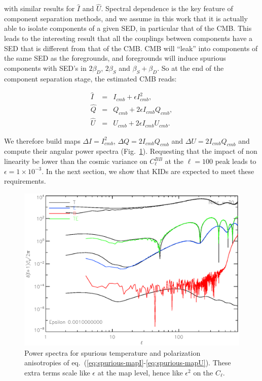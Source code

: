 \noindent with similar results for $\hat{I}$ and $\hat{U}$. Spectral dependence is the key
feature of component separation methods, and we assume in this work that it is
actually able to isolate components of a given SED, in particular that of the
CMB. This leads to the interesting result that all the couplings between
components have a SED that is different from that of the CMB. CMB will ``leak''
into components of the same SED as the foregrounds, and foregrounds will induce
spurious components with SED's in $2\beta_D$, $2\beta_S$ and
$\beta_S+\beta_D$. So at the end of the component separation stage, the
estimated CMB reads:

\begin{eqnarray}
\hat{I} &=& I_{cmb} +  \epsilon I_{cmb}^2, \label{eq:spurious-mapI}\\
\hat{Q} &=& Q_{cmb} + 2\epsilon I_{cmb}Q_{cmb}, \label{eq:spurious-mapQ}\\
\hat{U} &=& U_{cmb} + 2\epsilon I_{cmb}U_{cmb} \label{eq:spurious-mapU}.
\end{eqnarray}

We therefore build maps $\Delta I = I_{cmb}^2$, $\Delta Q = 2I_{cmb}Q_{cmb}$ and
$\Delta U = 2I_{cmb}Q_{cmb}$ and compute their angular power spectra
(Fig.~\ref{fig:fg_nl_residuals}). Requesting that the impact of non linearity be
lower than the cosmic variance on $C^{BB}_\ell$ at the $\ell=100$ peak leads to
$\epsilon = 1\times 10^{-3}$. In the next section, we show that KIDs are expected
to meet these requirements.



\begin{figure}
\center
\includegraphics[clip,angle=0,width=\columnwidth]{Figures/non_linear_fg_residuals_cl_epsilon_1d-3.eps}
\caption{Power spectra for spurious temperature and polarization anisotropies of
  eq.~(\ref{eq:spurious-mapI}-\ref{eq:spurious-mapU}). These extra terms scale
  like $\epsilon$ at the map level, hence like $\epsilon^2$ on the $C_\ell$.}
\label{fig:fg_nl_residuals}
\end{figure}

